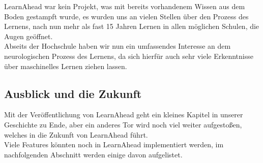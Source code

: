 \noindent
LearnAhead war kein Projekt, was mit bereits vorhandenem Wissen aus dem Boden gestampft wurde, es wurden uns an vielen Stellen über den Prozess des Lernens, nach nun mehr als fast 15 Jahren Lernen in allen möglichen Schulen, die Augen geöffnet.\\ 

\noindent
Abseits der Hochschule haben wir nun ein umfassendes Interesse an dem neurologischen Prozess des Lernens, da sich hierfür auch sehr viele Erkenntnisse über maschinelles Lernen ziehen lassen.

\subsection{Ausblick und die Zukunft}\label{sec:Ausblick}
Mit der Veröffentlichung von LearnAhead geht ein kleines Kapitel in unserer Geschichte zu Ende, aber ein anderes Tor wird noch viel weiter aufgestoßen, welches in die Zukunft von LearnAhead führt.\\
Viele Features könnten noch in LearnAhead implementiert werden, im nachfolgenden Abschnitt werden einige davon aufgelistet.\\
\noindent

